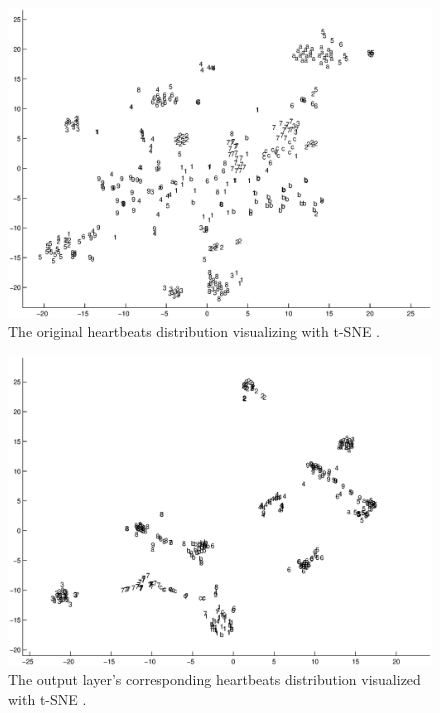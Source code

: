 \documentclass[conference]{IEEEtran}
\begin{document}
\begin{figure}[t]
\centering
\includegraphics[width=7.2in]{distr.eps}
\caption{The original heartbeats distribution visualizing with t-SNE \cite{Van}.}
\label{figure4}
\end{figure}

\begin{figure}[t]
\centering
\includegraphics[width=7.2in]{mapdistr.eps}
\caption{The output layer's corresponding heartbeats distribution visualized with t-SNE \cite{Van}.}
\label{figure5}
\end{figure}
\end{document}
